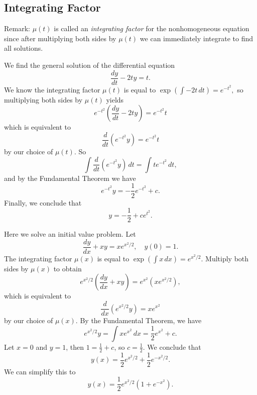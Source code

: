 \subsection{Integrating Factor}
Remark: $\mu(t)$ is called an \emph{integrating factor} for the nonhomogeneous equation since after multiplying both sides by $\mu(t)$ we can immediately integrate to find all solutions.
\begin{example}
    We find the general solution of the differential equation \[
    \frac{dy}{dt}-2ty=t.
    \]
    We know the integrating factor $\mu(t)$ is equal to $\exp\left( \int -2t \, dt \right) = e^{-t^2},$ so multiplying both sides by $\mu(t)$ yields \[
        e^{-t^2}\left( \frac{dy}{dt}-2ty \right) =e^{-t^2}t
    \] which is equivalent to \[
    \frac{d}{dt} \left( e^{-t^2}y \right) = e^{-t^2}t
    \]
    by our choice of $\mu(t)$. So \[
        \int \frac{d}{dt} \left( e^{-t^2}y \right)  \, dt = \int t e^{-t^2} \, dt, 
    \]
    and by the Fundamental Theorem we have \[
    e^{-t^2}y=-\frac{1}{2} e^{-t^2} + c.
    \]
     Finally, we conclude that \[
     y=-\frac{1}{2}+ce^{t^2}.
     \]
\end{example}
\begin{example}
    Here we solve an initial value problem. Let \[
        \frac{dy}{dx}+xy=xe^{x^2/2}, \quad y(0)=1.
    \] The integrating factor $\mu(x)$ is equal to $\exp\left( \int x\, dx \right) = e^{x^2/2}$. Multiply both sides by $\mu(x)$ to obtain \[
    e^{x^2/2}\left( \frac{dy}{dx}+xy \right) =e^{x^2}\left( xe^{x^2/2} \right),
    \] which is equivalent to
    \[
        \frac{d}{dx}\left( e^{x^2/2} y \right) = xe^{x^2}
    \]
    by our choice of $\mu(x)$. By the Fundamental Theorem, we have \[
    e^{x^2/2}y=\int xe^{x^2} \, dx=\frac{1}{2}e^{x^2}+c.
    \]
    Let $x=0$ and $y=1$, then  $1=\frac{1}{2}+c$, so $c=\frac{1}{2}$. We conclude that \[
        y(x)=\frac{1}{2}e^{x^2/2}+\frac{1}{2}e^{-x^2/2}.
\] We can simplify this to \[
y(x) = \frac{1}{2}e^{x^2/2}\left( 1+e^{-x^2} \right) .
\]
\end{example}




